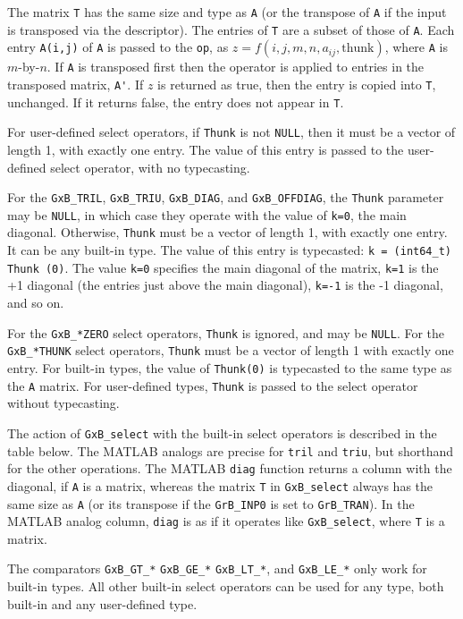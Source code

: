 \documentclass[12pt]{article}
\begin{document}
The matrix \verb'T' has the same size and type as \verb'A' (or the transpose of
\verb'A' if the input is transposed via the descriptor).  The entries of
\verb'T' are a subset of those of \verb'A'.  Each entry \verb'A(i,j)' of
\verb'A' is passed to the \verb'op', as $z=f(i,j,m,n,a_{ij},\mbox{thunk})$,
where \verb'A' is $m$-by-$n$.  If \verb'A' is transposed first then the
operator is applied to entries in the transposed matrix, \verb"A'".  If $z$ is
returned as true, then the entry is copied into \verb'T', unchanged.  If it
returns false, the entry does not appear in \verb'T'.

For user-defined select operators, if \verb'Thunk' is not \verb'NULL', then it
must be a vector of length 1, with exactly one entry.  The value of this entry
is passed to the user-defined select operator, with no typecasting.

For the \verb'GxB_TRIL', \verb'GxB_TRIU', \verb'GxB_DIAG', and
\verb'GxB_OFFDIAG', the \verb'Thunk' parameter may be \verb'NULL', in which
case they operate with the value of \verb'k=0', the main diagonal.  Otherwise,
\verb'Thunk' must be a vector of length 1, with exactly one entry.  It can be
any built-in type.  The value of this entry is typecasted:
\verb'k = (int64_t) Thunk (0)'.  The value \verb'k=0' specifies the main
diagonal of the matrix, \verb'k=1' is the +1 diagonal (the entries just above
the main diagonal), \verb'k=-1' is the -1 diagonal, and so on.

For the \verb'GxB_*ZERO' select operators, \verb'Thunk' is ignored, and may be
\verb'NULL'.  For the \verb'GxB_*THUNK' select operators, \verb'Thunk' must be
a vector of length 1 with exactly one entry.  For built-in types, the value of
\verb'Thunk(0)' is typecasted to the same type as the \verb'A' matrix.  For
user-defined types, \verb'Thunk' is passed to the select operator without
typecasting.

The action of \verb'GxB_select' with the built-in select operators is described
in the table below.  The MATLAB analogs are precise for \verb'tril' and
\verb'triu', but shorthand for the other operations.  The MATLAB \verb'diag'
function returns a column with the diagonal, if \verb'A' is a matrix, whereas
the matrix \verb'T' in \verb'GxB_select' always has the same size as \verb'A'
(or its transpose if the \verb'GrB_INP0' is set to \verb'GrB_TRAN').  In the
MATLAB analog column, \verb'diag' is as if it operates like \verb'GxB_select',
where \verb'T' is a matrix.

The comparators \verb'GxB_GT_*' \verb'GxB_GE_*' \verb'GxB_LT_*', and
\verb'GxB_LE_*' only work for built-in types.  All other built-in select
operators can be used for any type, both built-in and any user-defined type.
\end{document}

